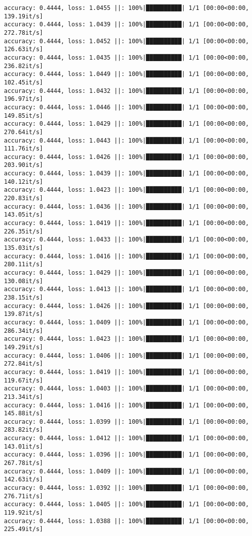 \documentclass[
]{article}
\begin{document}
\begin{verbatim}
accuracy: 0.4444, loss: 1.0455 ||: 100%|██████████| 1/1 [00:00<00:00, 139.19it/s]
accuracy: 0.4444, loss: 1.0439 ||: 100%|██████████| 1/1 [00:00<00:00, 272.78it/s]
accuracy: 0.4444, loss: 1.0452 ||: 100%|██████████| 1/1 [00:00<00:00, 126.63it/s]
accuracy: 0.4444, loss: 1.0435 ||: 100%|██████████| 1/1 [00:00<00:00, 236.82it/s]
accuracy: 0.4444, loss: 1.0449 ||: 100%|██████████| 1/1 [00:00<00:00, 102.45it/s]
accuracy: 0.4444, loss: 1.0432 ||: 100%|██████████| 1/1 [00:00<00:00, 196.97it/s]
accuracy: 0.4444, loss: 1.0446 ||: 100%|██████████| 1/1 [00:00<00:00, 149.85it/s]
accuracy: 0.4444, loss: 1.0429 ||: 100%|██████████| 1/1 [00:00<00:00, 270.64it/s]
accuracy: 0.4444, loss: 1.0443 ||: 100%|██████████| 1/1 [00:00<00:00, 111.76it/s]
accuracy: 0.4444, loss: 1.0426 ||: 100%|██████████| 1/1 [00:00<00:00, 203.90it/s]
accuracy: 0.4444, loss: 1.0439 ||: 100%|██████████| 1/1 [00:00<00:00, 140.12it/s]
accuracy: 0.4444, loss: 1.0423 ||: 100%|██████████| 1/1 [00:00<00:00, 220.83it/s]
accuracy: 0.4444, loss: 1.0436 ||: 100%|██████████| 1/1 [00:00<00:00, 143.05it/s]
accuracy: 0.4444, loss: 1.0419 ||: 100%|██████████| 1/1 [00:00<00:00, 226.35it/s]
accuracy: 0.4444, loss: 1.0433 ||: 100%|██████████| 1/1 [00:00<00:00, 135.03it/s]
accuracy: 0.4444, loss: 1.0416 ||: 100%|██████████| 1/1 [00:00<00:00, 280.11it/s]
accuracy: 0.4444, loss: 1.0429 ||: 100%|██████████| 1/1 [00:00<00:00, 130.08it/s]
accuracy: 0.4444, loss: 1.0413 ||: 100%|██████████| 1/1 [00:00<00:00, 238.15it/s]
accuracy: 0.4444, loss: 1.0426 ||: 100%|██████████| 1/1 [00:00<00:00, 139.87it/s]
accuracy: 0.4444, loss: 1.0409 ||: 100%|██████████| 1/1 [00:00<00:00, 286.34it/s]
accuracy: 0.4444, loss: 1.0423 ||: 100%|██████████| 1/1 [00:00<00:00, 149.29it/s]
accuracy: 0.4444, loss: 1.0406 ||: 100%|██████████| 1/1 [00:00<00:00, 272.84it/s]
accuracy: 0.4444, loss: 1.0419 ||: 100%|██████████| 1/1 [00:00<00:00, 119.67it/s]
accuracy: 0.4444, loss: 1.0403 ||: 100%|██████████| 1/1 [00:00<00:00, 213.34it/s]
accuracy: 0.4444, loss: 1.0416 ||: 100%|██████████| 1/1 [00:00<00:00, 145.88it/s]
accuracy: 0.4444, loss: 1.0399 ||: 100%|██████████| 1/1 [00:00<00:00, 283.82it/s]
accuracy: 0.4444, loss: 1.0412 ||: 100%|██████████| 1/1 [00:00<00:00, 143.01it/s]
accuracy: 0.4444, loss: 1.0396 ||: 100%|██████████| 1/1 [00:00<00:00, 267.78it/s]
accuracy: 0.4444, loss: 1.0409 ||: 100%|██████████| 1/1 [00:00<00:00, 142.63it/s]
accuracy: 0.4444, loss: 1.0392 ||: 100%|██████████| 1/1 [00:00<00:00, 276.71it/s]
accuracy: 0.4444, loss: 1.0405 ||: 100%|██████████| 1/1 [00:00<00:00, 119.92it/s]
accuracy: 0.4444, loss: 1.0388 ||: 100%|██████████| 1/1 [00:00<00:00, 225.49it/s]

\end{verbatim}
\end{document}
